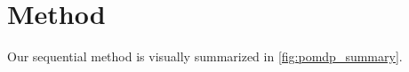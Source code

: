 \section{Method}\label{sec:det_method}





Our sequential method is visually summarized in \autoref{fig:pomdp_summary}.




